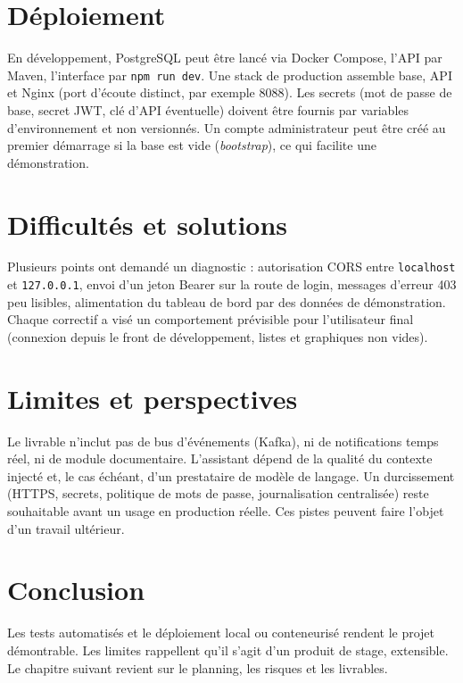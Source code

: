 \section{Déploiement}

En développement, PostgreSQL peut être lancé via Docker Compose, l'API par Maven, l'interface par \texttt{npm run dev}. Une stack de production assemble base, API et Nginx (port d'écoute distinct, par exemple 8088). Les secrets (mot de passe de base, secret JWT, clé d'API éventuelle) doivent être fournis par variables d'environnement et non versionnés. Un compte administrateur peut être créé au premier démarrage si la base est vide (\textit{bootstrap}), ce qui facilite une démonstration.

\section{Difficultés et solutions}

Plusieurs points ont demandé un diagnostic : autorisation CORS entre \texttt{localhost} et \texttt{127.0.0.1}, envoi d'un jeton Bearer sur la route de login, messages d'erreur 403 peu lisibles, alimentation du tableau de bord par des données de démonstration. Chaque correctif a visé un comportement prévisible pour l'utilisateur final (connexion depuis le front de développement, listes et graphiques non vides).

\section{Limites et perspectives}

Le livrable n'inclut pas de bus d'événements (Kafka), ni de notifications temps réel, ni de module documentaire. L'assistant dépend de la qualité du contexte injecté et, le cas échéant, d'un prestataire de modèle de langage. Un durcissement (HTTPS, secrets, politique de mots de passe, journalisation centralisée) reste souhaitable avant un usage en production réelle. Ces pistes peuvent faire l'objet d'un travail ultérieur.

\section{Conclusion}

Les tests automatisés et le déploiement local ou conteneurisé rendent le projet démontrable. Les limites rappellent qu'il s'agit d'un produit de stage, extensible. Le chapitre suivant revient sur le planning, les risques et les livrables.
